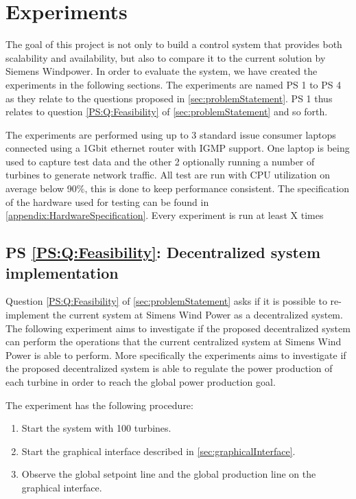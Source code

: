 
\chapter{Experiments}

\newcommand{\failingTurbineNumbers}{1, 5, 10 and 30}
\newcommand{\testTurbineNumbers}{2, 21, 41, 61, 81 and 101}
\newcommand{\testCycletimeNumbers}{5ms, 10ms, 15ms, 20ms, 25ms and 30ms}
\newcommand{\experiemntRunTime}{2mins}

The goal of this project is not only to build a control system that provides both scalability and availability, but also to compare it to the current solution by Siemens Windpower. 
In order to evaluate the system, we have created the experiments in the following sections. 
The experiments are named PS 1 to PS 4 as they relate to the questions proposed in \cref{sec:problemStatement}.
PS 1 thus relates to question \ref{PS:Q:Feasibility} of \cref{sec:problemStatement} and so forth.

The experiments are performed using up to 3 standard issue consumer laptops connected using a 1Gbit ethernet router with IGMP support.
One laptop is being used to capture test data and the other 2 optionally running a number of turbines to generate network traffic.
All test are run with CPU utilization on average below 90\%, this is done to keep performance consistent.
The specification of the hardware used for testing can be found in \cref{appendix:HardwareSpecification}.
Every experiment is run at least X times 

\section{PS \ref{PS:Q:Feasibility}: Decentralized system implementation}

Question \ref{PS:Q:Feasibility} of \cref{sec:problemStatement} asks if it is possible to re-implement the current system at Simens Wind Power as a decentralized system. The following experiment aims to investigate if the proposed decentralized system can perform the operations that the current centralized system at Simens Wind Power is able to perform. More specifically the experiments aims to investigate if the proposed decentralized system is able to regulate the power production of each turbine in order to reach the global power production goal.

The experiment has the following procedure:
\begin{enumerate}
	\item Start the system with 100 turbines.
	\item Start the graphical interface described in \cref{sec:graphicalInterface}.
	\item Observe the global setpoint line and the global production line on the graphical interface.
\end{enumerate}

